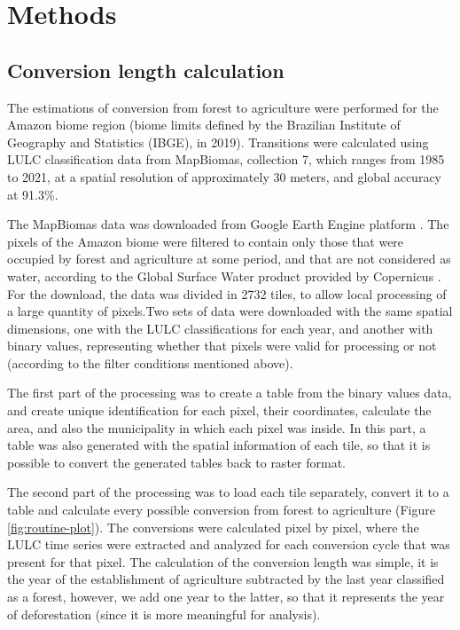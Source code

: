 \documentclass[essd, manuscript]{copernicus}
\begin{document}
\section{Methods}

\subsection{Conversion length calculation}

The estimations of conversion from forest to agriculture were performed for the Amazon biome region (biome limits defined by the Brazilian Institute of Geography and Statistics (IBGE), in 2019).
Transitions were calculated using LULC classification data from MapBiomas, collection 7, which ranges from 1985 to 2021, at a spatial resolution of approximately 30 meters, and global accuracy at 91.3\%.

The MapBiomas data was downloaded from Google Earth Engine platform \citep{Gorelick2017}.
The pixels of the Amazon biome were filtered to contain only those that were occupied by forest and agriculture at some period, and that are not considered as water, according to the Global Surface Water product provided by Copernicus \citep{Pekel2016}.
For the download, the data was divided in 2732 tiles, to allow local processing of a large quantity of pixels.Two sets of data were downloaded with the same spatial dimensions, one with the LULC classifications for each year, and another with binary values, representing whether that pixels were valid for processing or not (according to the filter conditions mentioned above).

The first part of the processing was to create a table from the binary values data, and create unique identification for each pixel, their coordinates, calculate the area, and also the municipality in which each pixel was inside.
In this part, a table was also generated with the spatial information of each tile, so that it is possible to convert the generated tables back to raster format.

The second part of the processing was to load each tile separately, convert it to a table and calculate every possible conversion from forest to agriculture (Figure \ref{fig:routine-plot}).
The conversions were calculated pixel by pixel, where the LULC time series were extracted and analyzed for each conversion cycle that was present for that pixel.
The calculation of the conversion length was simple, it is the year of the establishment of agriculture subtracted by the last year classified as a forest, however, we add one year to the latter, so that it represents the year of deforestation (since it is more meaningful for analysis).
\end{document}
